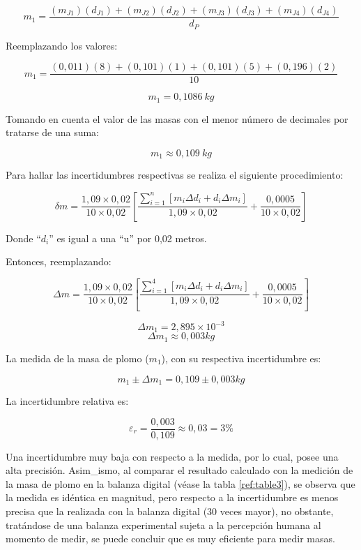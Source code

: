 \documentclass[../main.tex]{subfiles}
\begin{document}
\[m_1=\frac{\left(m_{J1}\right)\left(d_{J1}\right)+\left(m_{J2}\right)\left(d_{J2}\right)+\left(m_{J3}\right)\left(d_{J3}\right)+\left(m_{J4}\right)\left(d_{J4}\right)}{d_P}\]

Reemplazando los valores:

\[m_1=\frac{\left(0,011\right)\left(8\right)+\left(0,101\right)\left(1\right)+\left(0,101\right)\left(5\right)+\left(0,196\right)\left(2\right)}{10}\]

\[m_1=0,1086\ kg\]

Tomando en cuenta el valor de las masas con el menor número de decimales por tratarse de una suma:

\[m_1\approx0,109\ kg\]

Para hallar las incertidumbres respectivas se realiza el siguiente procedimiento:

\begin{equation} \label{calc1}
    \delta m = \frac{1,09 \times 0,02}{10\times 0,02} 
    \left[ \frac{ \sum_{i=1}^n [m_i \Delta d_i + d_i \Delta m_i]}{1,09\times 0,02}
    +\frac{0,0005}{10\times 0,02} \right]
\end{equation}

Donde “$d_i$” es igual a una “u” por 0,02 metros.

Entonces, reemplazando:

\begin{equation*}
    \Delta m = \frac{1,09 \times 0,02}{10\times 0,02} 
    \left[ \frac{ \sum_{i=1}^4 [m_i \Delta d_i + d_i \Delta m_i]}{1,09\times 0,02}
    +\frac{0,0005}{10\times 0,02} \right]
\end{equation*}

\[\Delta m_1 = 2,895\times10^{-3}\]
\[\Delta m_1\approx 0,003 kg\]

La medida de la masa de plomo ($m_1$), con su respectiva incertidumbre es:

\[m_1\pm\Delta m_1=0,109\pm0,003 kg\]

La incertidumbre relativa es:

\[\varepsilon_r=\frac{0,003}{0,109}\approx0,03=3\%\]

Una incertidumbre muy baja con respecto a la medida, por lo cual, 
posee una alta precisión. Asim_ismo, al comparar el resultado 
calculado con la medición de la masa de plomo en la balanza 
digital (véase la tabla \ref{ref:table3}), se observa que la medida es 
idéntica en magnitud, pero respecto a la incertidumbre es
menos precisa que la realizada con la balanza digital
(30 veces mayor), no obstante, tratándose de una balanza 
experimental sujeta a la percepción humana al momento de medir,
se puede concluir que es muy eficiente para medir masas.
\end{document}
